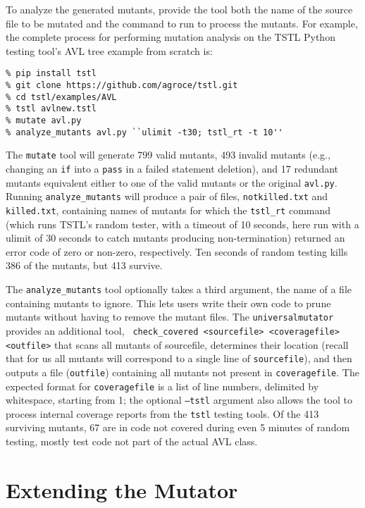 To analyze the generated mutants, provide the tool both the name of the
source file to be mutated and the command to run to process the
mutants.  For example, the complete process for performing mutation
analysis on the TSTL \cite{tstlsttt,nfm15} Python testing tool's AVL tree example from scratch is:

{\scriptsize
\begin{verbatim}
% pip install tstl
% git clone https://github.com/agroce/tstl.git
% cd tstl/examples/AVL
% tstl avlnew.tstl
% mutate avl.py
% analyze_mutants avl.py ``ulimit -t30; tstl_rt -t 10''
\end{verbatim}
}

The {\tt mutate} tool will generate 799 valid mutants, 493 invalid
mutants (e.g., changing an {\tt if} into a {\tt pass} in a failed
statement deletion), and 17 redundant mutants equivalent either to one
of the valid mutants or the original {\tt avl.py}.
Running {\tt analyze\_mutants} will produce a pair of files, {\tt notkilled.txt} and {\tt
  killed.txt}, containing names of mutants for which the {\tt tstl\_rt}
command (which runs TSTL's random tester, with a timeout of 10
seconds, here run with a ulimit of 30 seconds to catch mutants
producing non-termination)
returned an error code of zero or non-zero, respectively.  Ten seconds
of random testing kills 386 of the mutants, but 413 survive.

The {\tt analyze\_mutants} tool optionally takes a third argument, the
name of a file containing mutants to ignore.  This lets users write
their own code to prune mutants without having to remove the mutant
files.  The {\tt universalmutator} provides an additional tool, {\tt
  check\_covered <sourcefile> <coveragefile> <outfile>} that scans all
mutants of sourcefile, determines their location (recall that for us all mutants will correspond to a single line
of {\tt sourcefile}), and then outputs a file ({\tt outfile})
containing all mutants not present in {\tt coveragefile}.  The
expected format for {\tt coveragefile} is a list of line numbers,
delimited by whitespace, starting from 1; the optional {\tt --tstl}
argument also allows the tool to process internal coverage reports
from the {\tt tstl} testing tools.  Of the 413 surviving mutants, 67
are in code not covered during even 5 minutes of random testing, mostly test code not part of the actual AVL class.

\section{Extending the Mutator}

